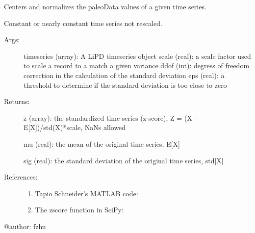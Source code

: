 \documentclass[letterpaper,10pt,english]{sphinxmanual}
\begin{document}
\begin{fulllineitems}
\label{\detokenize{Main:pyleoclim.standardizeTs}}
Centers and normalizes the paleoData values of a  given time series.

Constant or nearly constant time series not rescaled.
\begin{description}
\item[{Args:}] \leavevmode
timeseries (array): A LiPD timeseries object 
scale (real): a scale factor used to scale a record to a match a given variance
ddof (int): degress of freedom correction in the calculation of the standard deviation
eps (real): a threshold to determine if the standard deviation is too close to zero

\item[{Returns:}] \leavevmode
z (array): the standardized time series (z-score), Z = (X - E{[}X{]})/std(X)*scale, NaNs allowed

mu (real): the mean of the original time series, E{[}X{]}

sig (real): the standard deviation of the original time series, std{[}X{]}

\item[{References:}] \leavevmode\begin{enumerate}
\def\theenumi{\arabic{enumi}}
\def\labelenumi{\theenumi .}
\makeatletter\def\p@enumii{\p@enumi \theenumi .}\makeatother
\item {} 
Tapio Schneider’s MATLAB code: 

\item {} 
The zscore function in SciPy: 

\end{enumerate}

\end{description}

@author: fzhu

\end{fulllineitems}

\end{document}

